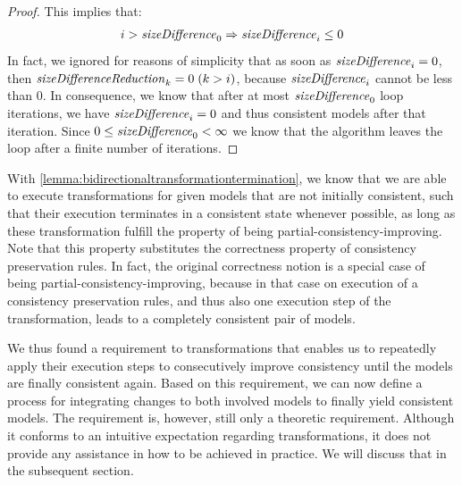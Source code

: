 \begin{proof}
    This implies that:
    \begin{align*}
        i > \mathit{sizeDifference}_{0} \Rightarrow \mathit{sizeDifference}_{i} \leq 0
    \end{align*}
    In fact, we ignored for reasons of simplicity that as soon as $\mathit{sizeDifference}_{i} = 0$, then $\mathit{sizeDifferenceReduction}_{k} = 0\; (k > i)$, because $\mathit{sizeDifference}_{i}$ cannot be less than $0$.
    In consequence, we know that after at most $\mathit{sizeDifference}_{0}$ loop iterations, we have $\mathit{sizeDifference}_{i} = 0$ and thus consistent models after that iteration.
    Since $0 \leq \mathit{sizeDifference}_{0} < \infty$ we know that the algorithm leaves the loop after a finite number of iterations.
\end{proof}

With \autoref{lemma:bidirectionaltransformationtermination}, we know that we are able to execute transformations for given models that are not initially consistent, such that their execution terminates in a consistent state whenever possible, as long as these transformation fulfill the property of being partial-consistency-improving.
Note that this property substitutes the correctness property of consistency preservation rules.
In fact, the original correctness notion is a special case of being partial-consistency-improving, because in that case on execution of a consistency preservation rules, and thus also one execution step of the transformation, leads to a completely consistent pair of models.

We thus found a requirement to transformations that enables us to repeatedly apply their execution steps to consecutively improve consistency until the models are finally consistent again.
Based on this requirement, we can now define a process for integrating changes to both involved models to finally yield consistent models.
The requirement is, however, still only a theoretic requirement. 
Although it conforms to an intuitive expectation regarding transformations, it does not provide any assistance in how to be achieved in practice. We will discuss that in the subsequent section.



